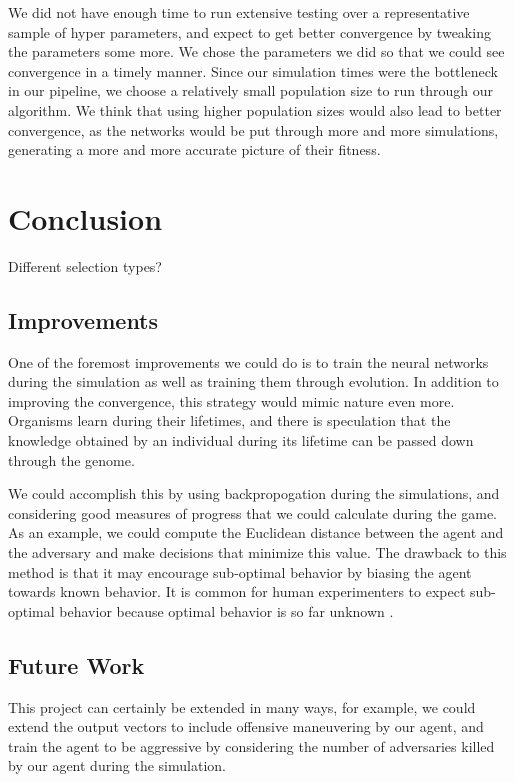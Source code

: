 \documentclass{article}
\begin{document}
We did not have enough time to run extensive testing over a representative
sample of hyper parameters, and expect to get better convergence by tweaking the
parameters some more. We chose the parameters we did so that we could see
convergence in a timely manner. Since our simulation times were the bottleneck
in our pipeline, we choose a relatively small population size to run through our
algorithm. We think that using higher population sizes would also lead to better
convergence, as the networks would be put through more and more simulations,
generating a more and more accurate picture of their fitness.

\section{Conclusion}
Different selection types?

\subsection{Improvements}\label{sec:improvements}
One of the foremost improvements we could do is to train the neural networks
during the simulation as well as training them through evolution. In addition
to improving the convergence, this strategy would mimic nature even more.
Organisms learn during their lifetimes, and there is speculation that the knowledge obtained by an individual during its lifetime can be passed down through the
genome.

We could accomplish this by using backpropogation during the simulations, and considering good measures of progress that we could calculate during the game. As an example, we could compute the Euclidean distance between the agent and the adversary and make decisions that minimize this value. The drawback to this method is that it may encourage sub-optimal behavior by biasing the agent towards known behavior. It is common for human experimenters to expect sub-optimal behavior because optimal behavior is so far unknown \cite{lehman}.

\subsection{Future Work}
This project can certainly be extended in many ways, for example, we could
extend the output vectors to include offensive maneuvering by our agent, and
train the agent to be aggressive by considering the number of adversaries killed
by our agent during the simulation.
\end{document}
